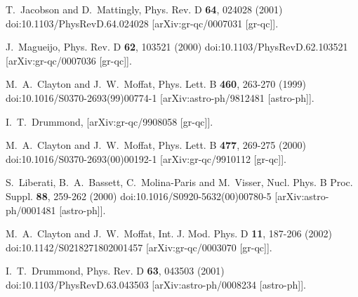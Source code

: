 \documentclass[jkps,preprint,fleqn]{revtex4} %
\begin{document}
\begin{thebibliography}{999}
T.~Jacobson and D.~Mattingly,
Phys. Rev. D \textbf{64}, 024028 (2001)
doi:10.1103/PhysRevD.64.024028
[arXiv:gr-qc/0007031 [gr-qc]].

J.~Magueijo,
Phys. Rev. D \textbf{62}, 103521 (2000)
doi:10.1103/PhysRevD.62.103521
[arXiv:gr-qc/0007036 [gr-qc]].


M.~A.~Clayton and J.~W.~Moffat,
Phys. Lett. B \textbf{460}, 263-270 (1999)
doi:10.1016/S0370-2693(99)00774-1
[arXiv:astro-ph/9812481 [astro-ph]].

I.~T.~Drummond,
[arXiv:gr-qc/9908058 [gr-qc]].

M.~A.~Clayton and J.~W.~Moffat,
Phys. Lett. B \textbf{477}, 269-275 (2000)
doi:10.1016/S0370-2693(00)00192-1
[arXiv:gr-qc/9910112 [gr-qc]].

S.~Liberati, B.~A.~Bassett, C.~Molina-Paris and M.~Visser,
Nucl. Phys. B Proc. Suppl. \textbf{88}, 259-262 (2000)
doi:10.1016/S0920-5632(00)00780-5
[arXiv:astro-ph/0001481 [astro-ph]].

M.~A.~Clayton and J.~W.~Moffat,
Int. J. Mod. Phys. D \textbf{11}, 187-206 (2002)
doi:10.1142/S0218271802001457
[arXiv:gr-qc/0003070 [gr-qc]].

I.~T.~Drummond,
Phys. Rev. D \textbf{63}, 043503 (2001)
doi:10.1103/PhysRevD.63.043503
[arXiv:astro-ph/0008234 [astro-ph]].


\end{thebibliography}
\end{document}
